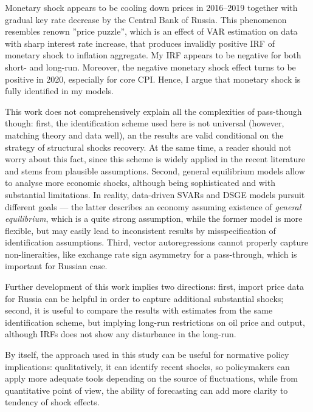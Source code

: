 \documentclass[12pt, a4paper]{extarticle}
\begin{document}
Monetary shock appears to be cooling down prices in 2016--2019 together with gradual key rate decrease by the Central Bank of Russia. This phenomenon resembles renown ''price puzzle'', which is an effect of VAR estimation on data with sharp interest rate increase, that produces invalidly positive IRF of monetary shock to inflation aggregate. My IRF appears to be negative for both short- and long-run. Moreover, the negative monetary shock effect turns to be positive in 2020, especially for core CPI. Hence, I argue that monetary shock is fully identified in my models.

This work does not comprehensively explain all the complexities of pass-though though: first, the identification scheme used here is not universal (however, matching theory and data well), an the results are valid conditional on the strategy of structural shocks recovery. At the same time, a reader should not worry about this fact, since this scheme is widely applied in the recent literature and stems from plausible assumptions. Second, general equilibrium models allow to analyse more economic shocks, although being sophisticated and with substantial limitations. In reality, data-driven SVARs and DSGE models pursuit different goals --- the latter describes an economy assuming existence of \textit{general equilibrium}, which is a quite strong assumption, while the former model is more flexible, but may easily lead to inconsistent results by misspecification of identification assumptions. Third, vector autoregressions cannot properly capture non-lineraities, like exchange rate sign asymmetry for a pass-through, which is important for Russian case.

Further development of this work implies two directions: first, import price data for Russia can be helpful in order to capture additional substantial shocks; second, it is useful to compare the results with estimates from the same identification scheme, but implying long-run restrictions on oil price and output, although IRFs does not show any disturbance in the long-run. 

By itself, the approach used in this study can be useful for normative policy implications: qualitatively, it can identify recent shocks, so policymakers can apply more adequate tools depending on the source of fluctuations, while from quantitative point of view, the ability of forecasting can add more clarity to tendency of shock effects.

\renewcommand*{\newblockpunct}{\addperiod\space\bibsentence}
\newpage
\linespread{1.3}
\end{document}
